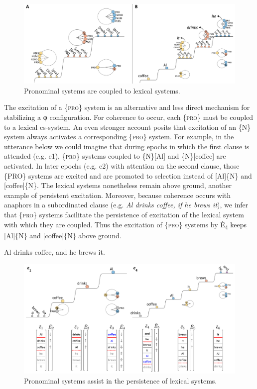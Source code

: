   
\begin{figure}
\includegraphics[width=\textwidth]{figures/Tilsen-img152.png}
\caption{Pronominal systems are coupled to lexical systems.}
\label{fig:7:8}
\end{figure}
 

  The excitation of a \{\textsc{pro}\} system is an alternative and less direct mechanism for stabilizing a φ configuration. For coherence to occur, each \{\textsc{pro}\} must be coupled to a lexical cs-system. An even stronger account posits that excitation of an \{N\} system always activates a corresponding \{\textsc{pro}\} system. For example, in the utterance below we could imagine that during epochs in which the first clause is attended (e.g. e1), \{\textsc{pro}\} systems coupled to \{N\}[Al] and \{N\}[coffee] are activated. In later epochs (e.g. e2) with attention on the second clause, those \{PRO\} systems are excited and are promoted to selection instead of [Al]\{N\} and [coffee]\{N\}. The lexical systems nonetheless remain above ground, another example of persistent excitation. Moreover, because coherence occurs with anaphors in a subordinated clause (e.g. \textit{Al drinks coffee, if he brews it}), we infer that \{\textsc{pro}\} systems facilitate the persistence of excitation of the lexical system with which they are coupled. Thus the excitation of \{\textsc{pro}\} systems by Ê\textsubscript{4} keeps [Al]\{N\} and [coffee]\{N\} above ground.

  \ea
  {Al drinks coffee, and he brews it.}
\z
  
\begin{figure}
\includegraphics[width=\textwidth]{figures/Tilsen-img153.png}
\caption{Pronominal systems assist in the persistence of lexical systems.}
\label{fig:7:9}
\end{figure}
 

